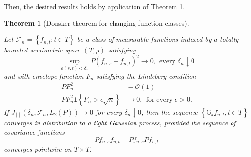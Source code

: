 \documentclass{article}
\newcommand{\set}[1]{\left\{#1\right\}}
\newcommand{\F}{\mathcal{F}}
\newcommand{\Gbb}{\mathbb{G}}
\newcommand{\1}{\mathbf{1}}
\theoremstyle{alden}
\theoremstyle{aldenthm}
\newtheorem{theorem}{Theorem}
\theoremstyle{remark}
\begin{document}
Then, the desired results holds by application of Theorem \ref{thm: donsker_changing_classes}.

\begin{theorem}[Donsker theorem for changing function classes]
	\label{thm: donsker_changing_classes}
	
	Let $\F_n = \set{f_{n,t}: t \in T}$ be a class of measurable functions indexed by a totally bounded semimetric space $(T,\rho)$ satisfying
	\begin{equation*}
	\sup_{\rho(s,t) < \delta_n} P (f_{n,s} - f_{n,t})^2 \to 0, ~~ \text{every $\delta_n \downarrow 0$}
	\end{equation*}
	and with envelope function $F_n$ satisfying the Lindeberg condition
	\begin{align*}
	PF_n^2 & = \mathcal{O}(1) \\
	PF_n^2 \1 \set{F_n > \epsilon \sqrt{n}} & \to 0, ~~ \textrm{for every $\epsilon > 0$.}
	\end{align*}
	If $J_{[]}(\delta_n, \F_n, L_2(P)) \to 0$ for every $\delta_n \downarrow 0$, then the sequence $\set{\Gbb_n f_{n,t}, t \in T}$ converges in distribution to a tight Gaussian process, provided the sequence of covariance functions
	\begin{equation*}
	P f_{n,s} f_{n,t} - P f_{n,s} P f_{n,t} 
	\end{equation*}
	converges pointwise on $T \times T$. 
\end{theorem}
\end{document}
